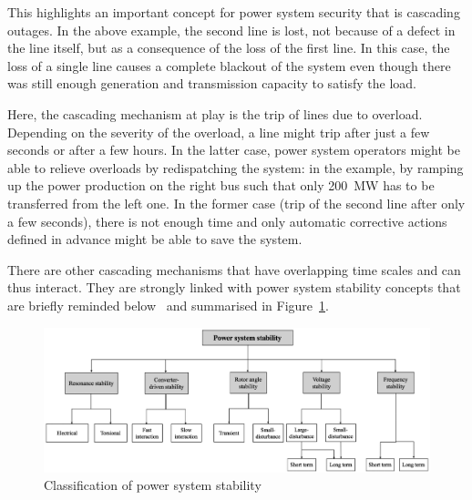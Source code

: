 This highlights an important concept for power system security that is cascading outages. In the above example, the second line is lost, not because of a defect in the line itself, but as a consequence of the loss of the first line. In this case, the loss of a single line causes a complete blackout of the system even though there was still enough generation and transmission capacity to satisfy the load.

Here, the cascading mechanism at play is the trip of lines due to overload. Depending on the severity of the overload, a line might trip after just a few seconds or after a few hours. In the latter case, power system operators might be able to relieve overloads by redispatching the system: in the example, by ramping up the power production on the right bus such that only 200~MW has to be transferred from the left one. In the former case (trip of the second line after only a few seconds), there is not enough time and only automatic corrective actions defined in advance might be able to save the system.

There are other cascading mechanisms that have overlapping time scales and can thus interact. They are strongly linked with power system stability concepts that are briefly reminded below~\cite{StabilityDefinition, StabilityDefinitionRevised} and summarised in Figure~\ref{fig:stability_classification}.

\begin{figure}
    \centering
    \includegraphics[width=\linewidth]{Figs/StabilityClassification.png}
    \caption{Classification of power system stability~\cite{StabilityDefinitionRevised}}
    \label{fig:stability_classification}
\end{figure}

